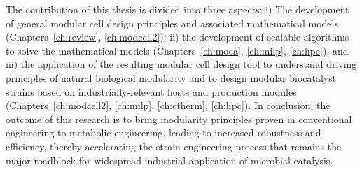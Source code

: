 

The contribution of this thesis is divided into three aspects:
i) The development of general modular cell design principles and associated mathematical models (Chapters~\ref{ch:review}, \ref{ch:modcell2});
ii) the development of scalable algorithms to solve the mathematical models (Chapters~\ref{ch:moea}, \ref{ch:milp}, \ref{ch:hpc});
and iii) the application of the resulting modular cell design tool to understand driving principles of natural biological modularity and to design modular biocatalyst strains based on industrially-relevant hosts and production modules (Chapters~\ref{ch:modcell2}, \ref{ch:milp}, \ref{ch:ctherm}, \ref{ch:hpc}). %
In conclusion, the outcome of this research is to bring modularity principles proven in conventional engineering to metabolic engineering, leading to increased robustness and efficiency, thereby accelerating the strain engineering process that remains the major roadblock for widespread industrial application of microbial catalysis.

